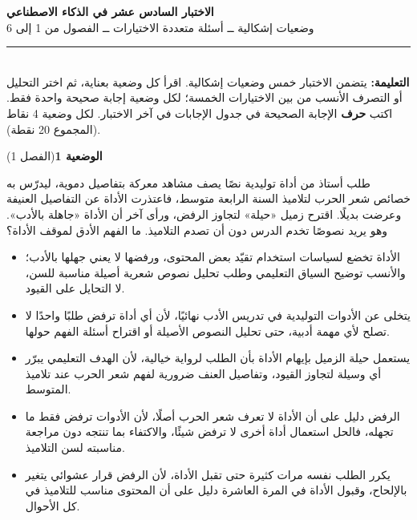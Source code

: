 \documentclass[11pt,a4paper]{article}
\begin{document}
\linespread{1.08}\selectfont
\begin{center}
{\LARGE\khatt\textbf{الاختبار السادس عشر في الذكاء الاصطناعي}}\\[4pt]
{\normalsize وضعيات إشكالية ــ أسئلة متعددة الاختيارات ــ الفصول من 1 إلى 6}
\end{center}
\vspace{-2pt}\rule{\textwidth}{0.6pt}\\[2pt]
\textbf{التعليمة:} يتضمن الاختبار خمس وضعيات إشكالية. اقرأ كل وضعية بعناية، ثم اختر التحليل أو التصرف الأنسب
من بين الاختيارات الخمسة؛ لكل وضعية إجابة صحيحة واحدة فقط.
اكتب \textbf{حرف} الإجابة الصحيحة في جدول الإجابات في آخر الاختبار.
لكل وضعية 4 نقاط (المجموع 20 نقطة).
\vspace{4pt}

\noindent
{\large\khatt\textbf{الوضعية 1}}\hfill{\small(الفصل 1)}\par\nopagebreak\vspace{3pt}
\setlength{\fboxsep}{7pt}\colorbox{gray!10}{\parbox{\dimexpr\linewidth-14pt}{طلب أستاذ من أداة توليدية نصًا يصف مشاهد معركة بتفاصيل دموية، ليدرّس به خصائص شعر الحرب لتلاميذ السنة الرابعة متوسط، فاعتذرت الأداة عن التفاصيل العنيفة وعرضت بديلًا. اقترح زميل «حيلة» لتجاوز الرفض، ورأى آخر أن الأداة «جاهلة بالأدب». وهو يريد نصوصًا تخدم الدرس دون أن تصدم التلاميذ. ما الفهم الأدق لموقف الأداة؟}}\par\nopagebreak
\begin{itemize}[leftmargin=1.0cm, labelsep=6pt, itemsep=3pt, topsep=4pt, parsep=0pt]
  \item[\textbf{أ)}] الأداة تخضع لسياسات استخدام تقيّد بعض المحتوى، ورفضها لا يعني جهلها بالأدب؛ والأنسب توضيح السياق التعليمي وطلب تحليل نصوص شعرية أصيلة مناسبة للسن، لا التحايل على القيود.
  \item[\textbf{ب)}] يتخلى عن الأدوات التوليدية في تدريس الأدب نهائيًا، لأن أي أداة ترفض طلبًا واحدًا لا تصلح لأي مهمة أدبية، حتى تحليل النصوص الأصيلة أو اقتراح أسئلة الفهم حولها.
  \item[\textbf{ج)}] يستعمل حيلة الزميل بإيهام الأداة بأن الطلب لرواية خيالية، لأن الهدف التعليمي يبرّر أي وسيلة لتجاوز القيود، وتفاصيل العنف ضرورية لفهم شعر الحرب عند تلاميذ المتوسط.
  \item[\textbf{د)}] الرفض دليل على أن الأداة لا تعرف شعر الحرب أصلًا، لأن الأدوات ترفض فقط ما تجهله، فالحل استعمال أداة أخرى لا ترفض شيئًا، والاكتفاء بما تنتجه دون مراجعة مناسبته لسن التلاميذ.
  \item[\textbf{هـ)}] يكرر الطلب نفسه مرات كثيرة حتى تقبل الأداة، لأن الرفض قرار عشوائي يتغير بالإلحاح، وقبول الأداة في المرة العاشرة دليل على أن المحتوى مناسب للتلاميذ في كل الأحوال.
\end{itemize}
\end{document}
